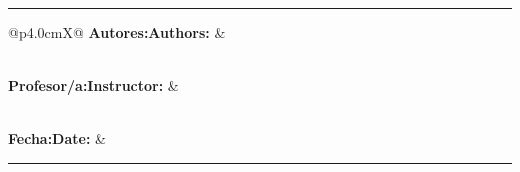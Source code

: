 \newcommand{\maketeampage}{%
  \thispagestyle{empty}

  \vspace*{8mm}

  \noindent
  {\bfseries\Large \titlee\par}

  \vspace{2mm}
  {\normalsize \subject\ \textbullet\ \doctype\ \docid\par}

  \vspace{10mm}
  \noindent\rule{\textwidth}{0.6pt}

  \vspace{10mm}

  \noindent
  {\setlength{\tabcolsep}{0pt}%
  \renewcommand{\arraystretch}{1.55}%
  \begin{tabularx}{\textwidth}{@{}p{4.0cm}X@{}}
  {\bfseries \ifES Autores:\else Authors:\fi} &
  \parbox[t]{\linewidth}{\authors\vspace{0.55cm}} \\

  {\bfseries \ifES Profesor/a:\else Instructor:\fi} &
  \parbox[t]{\linewidth}{\teacher} \\[0.75cm]

  {\bfseries \ifES Fecha:\else Date:\fi} &
  \parbox[t]{\linewidth}{\placedate}
  \end{tabularx}}

  \vfill

  \noindent\rule{\textwidth}{0.6pt}

  \newpage
}







\hypersetup{pageanchor=false}

\makecover
\maketeampage

\hypersetup{pageanchor=true}
\setcounter{page}{1}
\pagestyle{fancy}


\ifES
  
\else
  
\fi

\newpage


